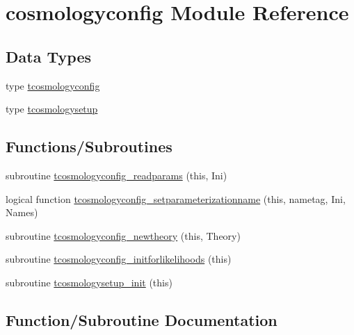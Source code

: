 \hypertarget{namespacecosmologyconfig}{}\section{cosmologyconfig Module Reference}
\label{namespacecosmologyconfig}
\subsection*{Data Types}
\begin{DoxyCompactItemize}
\item 
type \mbox{\hyperlink{structcosmologyconfig_1_1tcosmologyconfig}{tcosmologyconfig}}
\item 
type \mbox{\hyperlink{structcosmologyconfig_1_1tcosmologysetup}{tcosmologysetup}}
\end{DoxyCompactItemize}
\subsection*{Functions/\+Subroutines}
\begin{DoxyCompactItemize}
\item 
subroutine \mbox{\hyperlink{namespacecosmologyconfig_acdea2393465448c7d709df546d6d23cf}{tcosmologyconfig\+\_\+readparams}} (this, Ini)
\item 
logical function \mbox{\hyperlink{namespacecosmologyconfig_ab003a3843b0310a9aeb90e5598343458}{tcosmologyconfig\+\_\+setparameterizationname}} (this, nametag, Ini, Names)
\item 
subroutine \mbox{\hyperlink{namespacecosmologyconfig_a06fe1484d890d220a81bc2f26abb6ee1}{tcosmologyconfig\+\_\+newtheory}} (this, Theory)
\item 
subroutine \mbox{\hyperlink{namespacecosmologyconfig_ab9b94813d4a8b98fea14ab45b476326e}{tcosmologyconfig\+\_\+initforlikelihoods}} (this)
\item 
subroutine \mbox{\hyperlink{namespacecosmologyconfig_a68dc4f75f02efd7cb4460a7dec05f508}{tcosmologysetup\+\_\+init}} (this)
\end{DoxyCompactItemize}


\subsection{Function/\+Subroutine Documentation}
\mbox{\label{namespacecosmologyconfig_ab9b94813d4a8b98fea14ab45b476326e}} 
